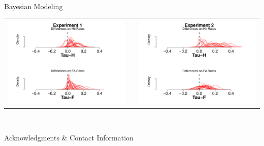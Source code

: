 \documentclass[final]{beamer}
\newlength{\onecolwid}
\newlength{\twocolwid}
\begin{document}
\begin{frame}[t]
\begin{columns}[t]
\begin{column}{\twocolwid}
\begin{columns}[t,totalwidth=\twocolwid]
\begin{column}{\onecolwid}
\begin{alertblock}{Bayesian Modeling}
\begin{enumerate}
\begin{center}
\begin{tabular}{ccc}
\includegraphics[width=0.46\linewidth]{Figures/Tau_1.pdf} & \hfill & \includegraphics[width=0.46\linewidth]{Figures/Tau_2.pdf}
\end{tabular}
\end{center}



$\quad$
\end{enumerate}

\end{alertblock}



\begin{alertblock}{Acknowledgments \& Contact Information}


\end{alertblock}
\end{column}
\end{columns}
\end{column}
\end{columns}
\end{frame}
\end{document}

